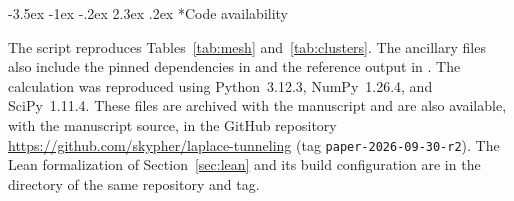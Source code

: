 \documentclass[twoside,10pt]{article}
\makeatletter
\numberwithin{equation}{section}
\theoremstyle{slbody}
\theoremstyle{definition}
\renewcommand{\section}{%
  \@startsection{section}{1}{\z@}%
    {-3.5ex \@plus -1ex \@minus -.2ex}%
    {2.3ex \@plus .2ex}%
    {\normalfont\large\bfseries}}
\makeatother
\begin{document}
\section*{Code availability}

\begin{sloppypar}
The script  reproduces Tables~\ref{tab:mesh}
and~\ref{tab:clusters}.  The ancillary files also include the pinned
dependencies in  and the reference output in
.  The calculation was reproduced using
Python~3.12.3, NumPy~1.26.4, and SciPy~1.11.4.  These files are archived with
the manuscript and are also available, with the manuscript source, in the
GitHub repository
\url{https://github.com/skypher/laplace-tunneling}
(tag \texttt{paper-2026-09-30-r2}).  The Lean formalization of
Section~\ref{sec:lean} and its build configuration are in the directory
 of the same repository and tag.
\end{sloppypar}

{\small
{}
\let\standardthebibliography\thebibliography
\renewcommand{\thebibliography}[1]{%
  \standardthebibliography{#1}%
  \setlength{\itemsep}{2pt}}


}
\end{document}
